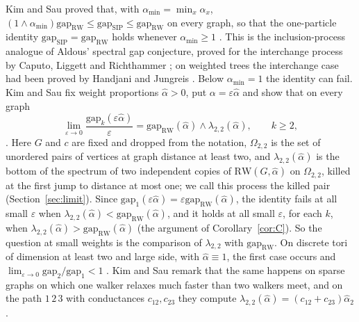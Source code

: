 \documentclass[11pt]{article}
\theoremstyle{remark}
\newcommand{\gap}{\mathrm{gap}}
\newcommand{\RW}{\mathrm{RW}}
\newcommand{\eps}{\varepsilon}
\begin{document}
Kim and Sau proved that, with $\alpha_{\min}=\min_x\alpha_x$, $(1\wedge\alpha_{\min})\gap_{\RW}\le\gap_{\mathrm{SIP}}\le\gap_{\RW}$ on every graph, so that the one-particle identity $\gap_{\mathrm{SIP}}=\gap_{\RW}$ holds whenever $\alpha_{\min}\ge1$ \cite{KS24}. This is the inclusion-process analogue of Aldous' spectral gap conjecture, proved for the interchange process by Caputo, Liggett and Richthammer \cite{CLR10}; on weighted trees the interchange case had been proved by Handjani and Jungreis \cite{HJ96}. Below $\alpha_{\min}=1$ the identity can fail. Kim and Sau fix weight proportions $\hat\alpha>0$, put $\alpha=\eps\hat\alpha$ and show that on every graph
\begin{equation}\label{eq:KSlimit}
\lim_{\eps\to0}\frac{\gap_k(\eps\hat\alpha)}{\eps}=\gap_{\RW}(\hat\alpha)\wedge\lambda_{2,2}(\hat\alpha),\qquad k\ge2,
\end{equation}
\cite[Corollaries~5.2 and~5.7, Propositions~5.10 and~5.14]{KS25}. Here $G$ and $c$ are fixed and dropped from the notation, $\Omega_{2,2}$ is the set of unordered pairs of vertices at graph distance at least two, and $\lambda_{2,2}(\hat\alpha)$ is the bottom of the spectrum of two independent copies of $\RW(G,\hat\alpha)$ on $\Omega_{2,2}$, killed at the first jump to distance at most one; we call this process the killed pair (Section~\ref{sec:limit}). Since $\gap_1(\eps\hat\alpha)=\eps\gap_{\RW}(\hat\alpha)$, the identity fails at all small $\eps$ when $\lambda_{2,2}(\hat\alpha)<\gap_{\RW}(\hat\alpha)$, and it holds at all small $\eps$, for each $k$, when $\lambda_{2,2}(\hat\alpha)>\gap_{\RW}(\hat\alpha)$ (the argument of Corollary~\ref{cor:C}). So the question at small weights is the comparison of $\lambda_{2,2}$ with $\gap_{\RW}$. On discrete tori of dimension at least two and large side, with $\hat\alpha\equiv1$, the first case occurs and $\lim_{\eps\to0}\gap_2/\gap_1<1$ \cite[Theorem~2.4]{KS25}. Kim and Sau remark that the same happens on sparse graphs on which one walker relaxes much faster than two walkers meet, and on the path $1\,2\,3$ with conductances $c_{12},c_{23}$ they compute $\lambda_{2,2}(\hat\alpha)=(c_{12}+c_{23})\hat\alpha_2$ \cite[Example~5.8]{KS25}.
\end{document}
